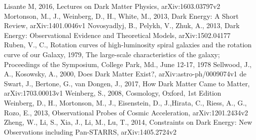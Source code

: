 \documentclass[a4paper,12pt]{article}
\begin{document}
\begin{thebibliography}{1}
Lisante M, 2016, Lectures on Dark Matter Physics, arXiv:1603.03797v2
Mortonson, M., J., Weinberg, D., H., White, M., 2013, Dark Energy: A Short Review, arXiv:1401.0046v1
Novosyadlyj, B., Pelykh, V., Zhuk, A., 2013, Dark Energy: Observational Evidence and Theoretical Models, arXiv:1502.04177
Ruben, V., C., Rotation curves of high-luminosity spiral galaxies and the rotation curve of our Galaxy, 1979, The large-scale characteristics of the galaxy; Proceedings of the Symposium, College Park, Md., June 12-17, 1978
Sellwood, J., A., Kosowsky, A., 2000, Does Dark Matter Exist?, arXiv:astro-ph/0009074v1
de Swart, J., Bertone, G., van Dongen, J., 2017, How Dark Matter Came to Matter, arXiv:1703.00013v1
Weinberg, S., 2008, Cosmology, Oxford, 1st Edition
Weinberg, D., H., Mortonson, M., J., Eisenstein, D., J.,Hirata, C., Riess, A., G., Rozo, E., 2013, Observational Probes of Cosmic Acceleration, arXiv:1201.2434v2
Zheng, W., Li, S., Xia, J., Li, M., Lu, T., 2014, Constraints on Dark Energy: New Observations including Pan-STARRS, arXiv:1405.2724v2
\end{thebibliography}
\end{document}
